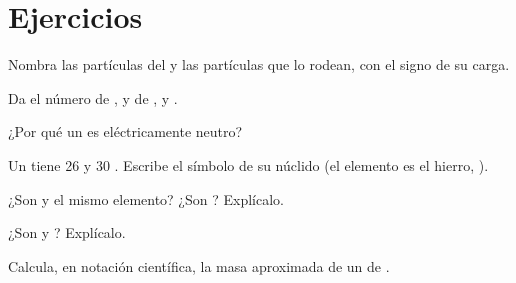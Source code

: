 \section{Ejercicios}

\begin{exercise}[$\star$]\label{exo:g9:inside-the-atom:1}
Nombra las partículas del  y las partículas que lo rodean, con el
signo de su carga.
\end{exercise}

\begin{exercise}[$\star$]\label{exo:g9:inside-the-atom:2}
Da el número de ,  y  de ,
 y .
\end{exercise}

\begin{exercise}[$\star$]\label{exo:g9:inside-the-atom:3}
¿Por qué un  es eléctricamente neutro?
\end{exercise}

\begin{exercise}[$\star$]\label{exo:g9:inside-the-atom:4}
Un  tiene 26  y 30 . Escribe el símbolo de su
núclido (el elemento es el hierro, ).
\end{exercise}

\begin{exercise}[$\star\star$]\label{exo:g9:inside-the-atom:5}
¿Son  y  el mismo elemento? ¿Son
? Explícalo.
\end{exercise}

\begin{exercise}[$\star\star$]\label{exo:g9:inside-the-atom:6}
¿Son   y ? Explícalo.
\end{exercise}

\begin{exercise}[$\star\star$]\label{exo:g9:inside-the-atom:7}
Calcula, en notación científica, la masa aproximada de un  de
.
\end{exercise}

